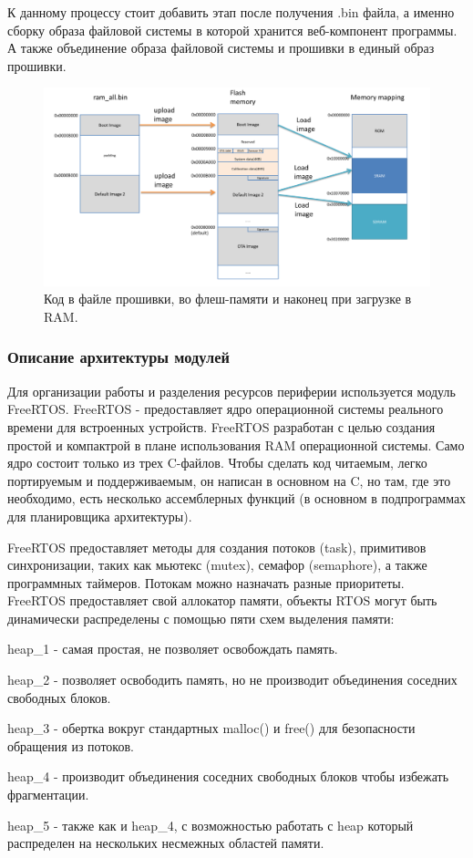 К данному процессу стоит добавить этап после получения .bin файла, а именно сборку образа файловой системы в которой хранится веб-компонент программы. А также объединение образа файловой системы и прошивки в единый образ прошивки. 


\begin{figure}[h!]
    \centering
    \includegraphics[width=1.0\textwidth]{from_firmware_to_ram.png}
    \caption{Код в файле прошивки, во флеш-памяти и наконец при загрузке в RAM.}
\end{figure}


\subsubsection{ Описание архитектуры модулей}
Для организации работы и разделения ресурсов периферии используется модуль FreeRTOS. 
FreeRTOS - предоставляет ядро операционной системы реального времени для встроенных устройств. FreeRTOS разработан с целью создания простой и компактрой в плане использования RAM операционной системы. Само ядро состоит только из трех C-файлов. Чтобы сделать код читаемым, легко портируемым и поддерживаемым, он написан в основном на C, но там, где это необходимо, есть несколько ассемблерных функций (в основном в подпрограммах для планировщика архитектуры).

FreeRTOS предоставляет методы для создания потоков (task), примитивов синхронизации, таких как мьютекс (mutex), семафор (semaphore), а также программных таймеров. Потокам можно назначать разные приоритеты. FreeRTOS предоставляет свой аллокатор памяти, объекты RTOS могут быть динамически распределены с помощью пяти схем выделения памяти:

\begin{my_enumerate}
\item heap\_1 - самая простая, не позволяет освобождать память.
\item heap\_2 - позволяет освободить память, но не производит объединения соседних свободных блоков.
\item heap\_3 - обертка вокруг стандартных malloc() и free() для безопасности обращения из потоков.
\item heap\_4 - производит объединения соседних свободных блоков чтобы избежать фрагментации.
\item heap\_5 - также как и heap\_4, с возможностью работать с heap который распределен на нескольких несмежных областей памяти.
\end{my_enumerate}

